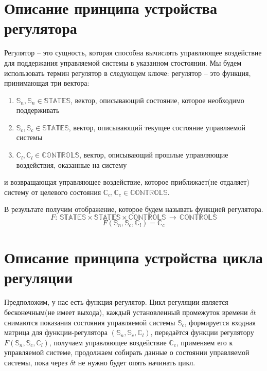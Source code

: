 \documentclass[14pt]{extreport}
\begin{document}
        \section{Описание принципа устройства регулятора}
            Регулятор -- это сущность, которая способна вычислять управляющее воздействие для поддержания управляемой системы в указанном стостоянии.
            Мы будем использовать термин регулятор в следующем ключе: регулятор -- это функция, принимающая три вектора:
            {
                \begin{enumerate}
                      \item \(\mathbb{S}_n, \mathbb{S}_n \in \mathbb{STATES}\),
                        вектор, описывающий состояние, которое необходимо поддерживать
                      \item \(\mathbb{S}_c, \mathbb{S}_c \in \mathbb{STATES}\),
                        вектор, описывающий текущее состояние управляемой системы
                      \item \(\mathbb{C}_l, \mathbb{C}_l \in \mathbb{CONTROLS}\),
                        вектор, описывающий прошлые управляющие воздействия, оказанные на систему
                \end{enumerate}
            }
            и возвращающая управляющее воздействие, которое приближает(не отдаляет) систему от целевого состояния \(\mathbb{C}_c, \mathbb{C}_c \in \mathbb{CONTROLS}\).

            В результате получим отображение, которое будем называть функцией регулятора.
            \[F:\,\mathbb{STATES}\times\mathbb{STATES}\times\mathbb{CONTROLS}\,\rightarrow\,\mathbb{CONTROLS}\]
            \[F(\mathbb{S}_n,\mathbb{S}_c,\mathbb{C}_l) = \mathbb{C}_c\]

        \section{Описание принципа устройства цикла регуляции}
            Предположим, у нас есть функция-регулятор. Цикл регуляции является бесконечным(не имеет выхода), каждый установленный промежуток времени $\delta t$ снимаются показания состояния управляемой системы $\mathbb{S}_c$, формируется входная матрица для функции-регулятора $(\mathbb{S}_n,\mathbb{S}_c,\mathbb{C}_l)$, передаётся функции регулятору $F(\mathbb{S}_n,\mathbb{S}_c,\mathbb{C}_l)$, получаем управляющее воздействие $ \mathbb{C}_c$, применяем его к управляемой системе, продолжаем собирать данные о состоянии управляемой системы, пока через $\delta t$ не нужно будет опять начинать цикл.
\end{document}
